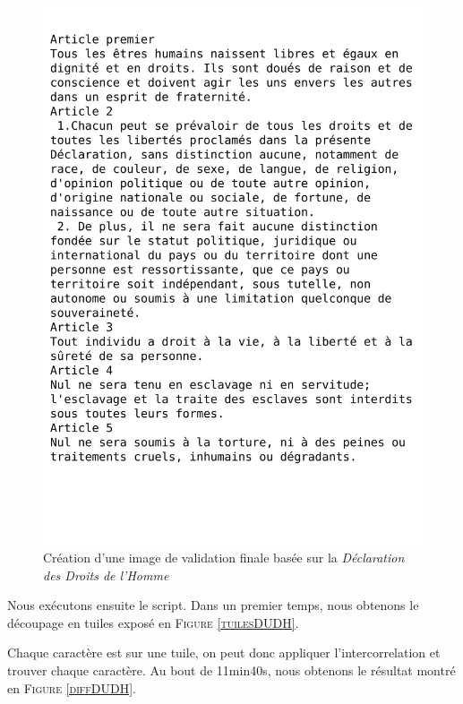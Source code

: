 \documentclass[a4paper,12pt,titlepage]{report}
\begin{document}
	\begin{figure}[h]
		\begin{center}
			\includegraphics[scale=0.45]{../../Data/DUDH.png}
		\end{center}
		\vspace{-4em}
		\caption{Création d'une image de validation finale basée sur la \textit{Déclaration des Droits de l'Homme}}
		\label{DUDH}
	\end{figure}
	
	Nous exécutons ensuite le script.
	Dans un premier temps, nous obtenons le découpage en tuiles exposé en \textsc{Figure \ref{tuilesDUDH}}.
	
	Chaque caractère est sur une tuile, on peut donc appliquer l'intercorrelation et trouver chaque caractère.
	Au bout de 11min40s, nous obtenons le résultat montré en \textsc{Figure \ref{diffDUDH}}.
	
\end{document}

